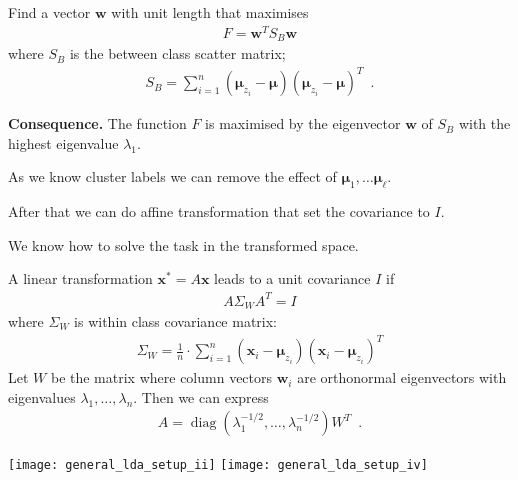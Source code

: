 \documentclass[landscape,footrule]{foils}
\renewcommand{\vec}[1]{\boldsymbol{#1}}
\DeclareMathOperator{\diag}{diag}
\begin{document}

Find a vector $\vec{w}$ with unit length that maximises
\begin{align*}
F=\vec{w}^T S_B\vec{w}
\end{align*}
where $S_B$ is the between class scatter matrix;
\begin{align*}
S_B=\sum_{i=1}^n(\vec{\mu}_{z_i}-\vec{\mu})(\vec{\mu}_{z_i}-\vec{\mu})^T \enspace.
\end{align*} 

\textbf{Consequence.}
The function $F$ is maximised by the eigenvector $\vec{w}$ of $S_B$ with the highest eigenvalue $\lambda_1$.



\begin{triangles}
\item As we know cluster labels we can remove the effect of $\vec{\mu}_1,\ldots\vec{\mu}_\ell$.
\item After that we can do affine transformation that set the covariance to $I$.
\item We know how to solve the task in the transformed space. 
\end{triangles}


A linear transformation $\vec{x}^*=A\vec{x}$ leads to a unit covariance $I$ if 
\begin{align*}
A\Sigma_W A^T=I
\end{align*}  
where $\Sigma_W$ is within class covariance matrix:
\begin{align*}
\Sigma_W=\frac{1}{n}\cdot \sum_{i=1}^n (\vec{x}_i-\vec{\mu}_{z_i})(\vec{x}_i-\vec{\mu}_{z_i})^T
\end{align*}
Let $W$ be the matrix where column vectors $\vec{w}_i$ are orthonormal eigenvectors with eigenvalues $\lambda_1,\ldots,\lambda_n$. Then we can express 
\begin{align*}
A=\diag(\lambda_1^{-1/2},\ldots,\lambda_n^{-1/2})W^T\enspace. 
\end{align*} 


\centerline{
\texttt{[image: general\_lda\_setup\_ii]}\hspace*{1cm}
\texttt{[image: general\_lda\_setup\_iv]}}\vspace*{-1ex}
\end{document}
